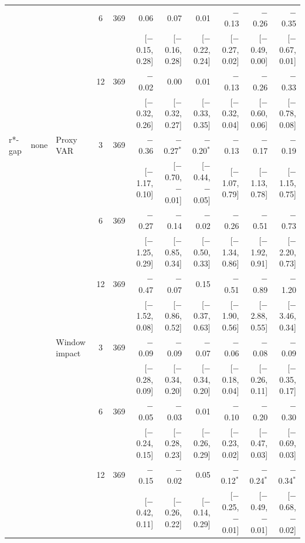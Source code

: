 \begin{table}[tp]
{\begin{tabular}{lllcrrrrrrr}
 &  &  & 6 & 369 & 0.06 & 0.07 & 0.01 & $-$0.13 & $-$0.26 & $-$0.35\\
 & & & & & {\tiny [$-$0.15, 0.28]} & {\tiny [$-$0.16, 0.28]} & {\tiny [$-$0.22, 0.24]} & {\tiny [$-$0.27, 0.02]} & {\tiny [$-$0.49, 0.00]} & {\tiny [$-$0.67, 0.01]}\\
 &  &  & 12 & 369 & $-$0.02 & 0.00 & 0.01 & $-$0.13 & $-$0.26 & $-$0.33\\
 & & & & & {\tiny [$-$0.32, 0.26]} & {\tiny [$-$0.32, 0.27]} & {\tiny [$-$0.33, 0.35]} & {\tiny [$-$0.32, 0.04]} & {\tiny [$-$0.60, 0.06]} & {\tiny [$-$0.78, 0.08]}\\
\addlinespace
r*-gap & none & Proxy VAR & 3 & 369 & $-$0.36 & $-$0.27$^{*}$ & $-$0.20$^{*}$ & $-$0.13 & $-$0.17 & $-$0.19\\
 & & & & & {\tiny [$-$1.17, 0.10]} & {\tiny [$-$0.70, $-$0.01]} & {\tiny [$-$0.44, $-$0.05]} & {\tiny [$-$1.07, 0.79]} & {\tiny [$-$1.13, 0.78]} & {\tiny [$-$1.15, 0.75]}\\
 &  &  & 6 & 369 & $-$0.27 & $-$0.14 & $-$0.02 & $-$0.26 & $-$0.51 & $-$0.73\\
 & & & & & {\tiny [$-$1.25, 0.29]} & {\tiny [$-$0.85, 0.34]} & {\tiny [$-$0.50, 0.33]} & {\tiny [$-$1.34, 0.86]} & {\tiny [$-$1.92, 0.91]} & {\tiny [$-$2.20, 0.73]}\\
 &  &  & 12 & 369 & $-$0.47 & $-$0.07 & 0.15 & $-$0.51 & $-$0.89 & $-$1.20\\
 & & & & & {\tiny [$-$1.52, 0.08]} & {\tiny [$-$0.86, 0.52]} & {\tiny [$-$0.37, 0.63]} & {\tiny [$-$1.90, 0.56]} & {\tiny [$-$2.88, 0.55]} & {\tiny [$-$3.46, 0.34]}\\
 &  & Window impact & 3 & 369 & $-$0.09 & $-$0.09 & $-$0.07 & $-$0.06 & $-$0.08 & $-$0.09\\
 & & & & & {\tiny [$-$0.28, 0.09]} & {\tiny [$-$0.34, 0.20]} & {\tiny [$-$0.34, 0.20]} & {\tiny [$-$0.18, 0.04]} & {\tiny [$-$0.26, 0.11]} & {\tiny [$-$0.35, 0.17]}\\
 &  &  & 6 & 369 & $-$0.05 & $-$0.03 & 0.01 & $-$0.10 & $-$0.20 & $-$0.30\\
 & & & & & {\tiny [$-$0.24, 0.15]} & {\tiny [$-$0.28, 0.23]} & {\tiny [$-$0.26, 0.29]} & {\tiny [$-$0.23, 0.02]} & {\tiny [$-$0.47, 0.03]} & {\tiny [$-$0.69, 0.03]}\\
 &  &  & 12 & 369 & $-$0.15 & $-$0.02 & 0.05 & $-$0.12$^{*}$ & $-$0.24$^{*}$ & $-$0.34$^{*}$\\
 & & & & & {\tiny [$-$0.42, 0.11]} & {\tiny [$-$0.26, 0.22]} & {\tiny [$-$0.14, 0.29]} & {\tiny [$-$0.25, $-$0.01]} & {\tiny [$-$0.49, $-$0.01]} & {\tiny [$-$0.68, $-$0.02]}\\

\end{tabular}}
\end{table}
